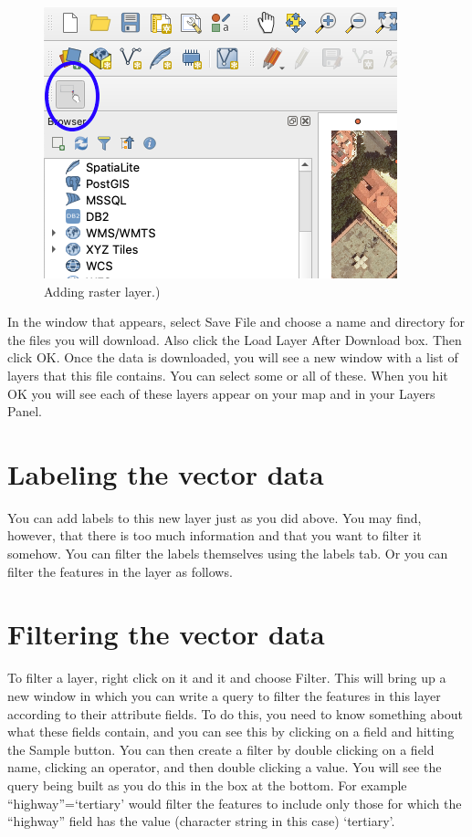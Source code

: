 \documentclass[]{book}
\begin{document}
\begin{figure}
\centering
\includegraphics{images/osmdownloader_button.png}
\caption{Adding raster layer.)}
\end{figure}

In the window that appears, select Save File and choose a name and directory for the files you will download. Also click the Load Layer After Download box. Then click OK. Once the data is downloaded, you will see a new window with a list of layers that this file contains. You can select some or all of these. When you hit OK you will see each of these layers appear on your map and in your Layers Panel.

\hypertarget{labeling-the-vector-data}{%
\section{Labeling the vector data}\label{labeling-the-vector-data}}

You can add labels to this new layer just as you did above. You may find, however, that there is too much information and that you want to filter it somehow. You can filter the labels themselves using the labels tab. Or you can filter the features in the layer as follows.

\hypertarget{filtering-the-vector-data}{%
\section{Filtering the vector data}\label{filtering-the-vector-data}}

To filter a layer, right click on it and it and choose Filter. This will bring up a new window in which you can write a query to filter the features in this layer according to their attribute fields. To do this, you need to know something about what these fields contain, and you can see this by clicking on a field and hitting the Sample button. You can then create a filter by double clicking on a field name, clicking an operator, and then double clicking a value. You will see the query being built as you do this in the box at the bottom. For example ``highway''=`tertiary' would filter the features to include only those for which the ``highway'' field has the value (character string in this case) `tertiary'.
\end{document}
